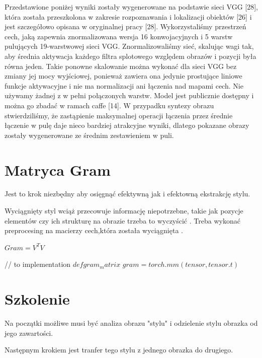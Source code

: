 \documentclass[brudnopis]{xmgr}
\begin{document}
Przedstawione poniżej wyniki zostały wygenerowane na podstawie sieci VGG [28], która została przeszkolona w zakresie rozpoznawania i lokalizacji obiektów [26] i jest szczegółowo opisana w oryginalnej pracy [28]. Wykorzystaliśmy przestrzeń cech, jaką zapewnia znormalizowana wersja 16 konwojacyjnych i 5 warstw pulujących 19-warstwowej sieci VGG. Znormalizowaliśmy sieć, skalując wagi tak, aby średnia aktywacja każdego filtra splotowego względem obrazów i pozycji była równa jeden. Takie ponowne skalowanie można wykonać dla sieci VGG bez zmiany jej mocy wyjściowej, ponieważ zawiera ona jedynie prostujące liniowe funkcje aktywacyjne i nie ma normalizacji ani łączenia nad mapami cech. Nie używamy żadnej z w pełni połączonych warstw. Model jest publicznie dostępny i można go zbadać w ramach caffe [14]. W przypadku syntezy obrazu stwierdziliśmy, że zastąpienie maksymalnej operacji łączenia przez średnie łączenie w pulę daje nieco bardziej atrakcyjne wyniki, dlatego pokazane obrazy zostały wygenerowane ze średnim zestawieniem w puli.

\section{Matryca Gram\label{s:dsssl}}

Jest to krok niezbędny aby osięgnąć efektywną jak i efektowną ekstrakcję stylu.

Wyciągnięty styl wciąż przecowuje informację niepotrzebne, takie jak pozycje elementów czy ich strukturę na obrazie trzeba to wyczyścić .
Treba wykonać preprocesing na macierzy cech,która została wyciągnięta .


$Gram = V^TV$

// to implementation 
$def gram_matrix $
$gram = torch.mm (tensor, tensor.t)$


\section{Szkolenie\label{s:dsssl}}

Na początki możliwe musi być analiza obrazu "stylu" i odzielenie stylu obrazka od jego zawartości. 

Następnym krokiem jest tranfer tego stylu z jednego obrazka do drugiego.
\end{document}
